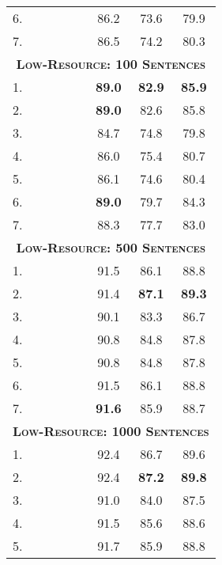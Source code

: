 \documentclass[11pt,a4paper]{article}
\newcommand{\cmark}{\textcolor{blue}{\ding{51}}}
\newcommand{\xmark}{\textcolor{red}{\ding{55}}}
\begin{document}
\begin{table}[]
\begin{tabular}{l|cccc||cc|c}
6. & \cmark & \cmark & \cmark & \xmark & 86.2 & 73.6 & 79.9 \\
7. & \cmark & \cmark & \cmark & \cmark & 86.5 & 74.2 & 80.3 \\
\hline\hline
\multicolumn{8}{c}{\bf \textsc{Low-Resource: 100 Sentences}}\\
\hline
1. & \xmark & \cmark & \xmark & \xmark & \textbf{89.0} & \textbf{82.9} & \textbf{85.9} \\
2. & \xmark & \cmark & \cmark & \xmark & \textbf{89.0} & 82.6 & 85.8 \\
3. & \cmark & \xmark & \xmark & \xmark & 84.7 & 74.8 & 79.8 \\
4. & \cmark & \xmark & \cmark & \xmark & 86.0 & 75.4 & 80.7 \\
5. & \cmark & \xmark & \cmark & \cmark & 86.1 & 74.6 & 80.4 \\
6. & \cmark & \cmark & \cmark & \xmark & \textbf{89.0} & 79.7 & 84.3 \\
7. & \cmark & \cmark & \cmark & \cmark & 88.3 & 77.7 & 83.0 \\
\hline\hline
\multicolumn{8}{c}{\bf \textsc{Low-Resource: 500 Sentences}}\\
\hline
1. & \xmark & \cmark & \xmark & \xmark & 91.5 & 86.1 & 88.8 \\
2. & \xmark & \cmark & \cmark & \xmark & 91.4 & \textbf{87.1} & \textbf{89.3} \\
3. & \cmark & \xmark & \xmark & \xmark & 90.1 & 83.3 & 86.7 \\
4. & \cmark & \xmark & \cmark & \xmark & 90.8 & 84.8 & 87.8 \\
5. & \cmark & \xmark & \cmark & \cmark & 90.8 & 84.8 & 87.8 \\
6. & \cmark & \cmark & \cmark & \xmark & 91.5 & 86.1 & 88.8 \\
7. & \cmark & \cmark & \cmark & \cmark & \textbf{91.6} & 85.9 & 88.7 \\
\hline\hline
\multicolumn{8}{c}{\bf \textsc{Low-Resource: 1000 Sentences}}\\
\hline
1. & \xmark & \cmark & \xmark & \xmark & 92.4 & 86.7 & 89.6 \\
2. & \xmark & \cmark & \cmark & \xmark & 92.4 & \textbf{87.2} & \textbf{89.8} \\
3. & \cmark & \xmark & \xmark & \xmark & 91.0 & 84.0 & 87.5 \\
4. & \cmark & \xmark & \cmark & \xmark & 91.5 & 85.6 & 88.6 \\
5. & \cmark & \xmark & \cmark & \cmark & 91.7 & 85.9 & 88.8 \\

\end{tabular}
\end{table}
\end{document}

